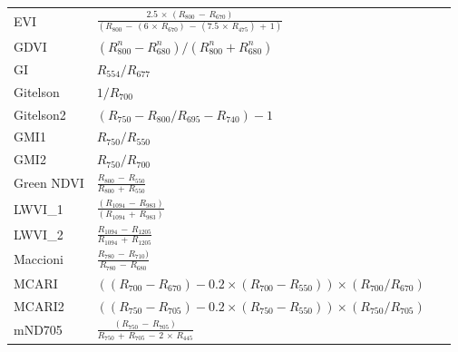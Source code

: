\documentclass[remotesensing,article,accept,moreauthors,pdftex]{Definitions/mdpi}
\begin{document}
\begin{paracol}{2}
\begin{specialtable}[H]
{\begin{tabular}{lll}
		EVI             & $\frac{2.5\,\times\, (R_{800}\,-\,R_{670}) }{ (R_{800}\,-\,(6\,\times\, R_{670})\,-\,(7.5\,\times\, R_{475})\,+\,1)}$           &~\cite{huete1997}             \\
		GDVI            & $(R_{800}^n-R_{680}^n) / (R_{800}^n+R_{680}^n)$  &~\cite{wu2014}                 \\
		GI              & $R_{554}/R_{677}$                                                                                    &~\cite{smith1995}              \\
		Gitelson        & $1/R_{700}$                                                                                          &~\cite{gitelson1999}           \\
		Gitelson2       & $(R_{750}-R_{800}/R_{695}-R_{740})-1$                                                                &~\cite{gitelson2003}           \\
		GMI1            & $R_{750}/R_{550}$                                                                                    &~\cite{gitelson2003}           \\
		GMI2            & $R_{750}/R_{700}$                                                                                    &~\cite{gitelson2003}           \\
		Green NDVI      & $\frac{R_{800}\,-\,R_{550}}{R_{800}\,+\,R_{550}}$                                                            &~\cite{gitelson1996}           \\
		LWVI\_1         & $\frac{(R_{1094}\,-\,R_{983})}{(R_{1094}\,+\,R_{983})}$                                                      &~\cite{galvao2005}             \\
		LWVI\_2         & $\frac{R_{1094}\,-\,R_{1205}}{R_{1094}\,+\,R_{1205}}$                                                        &~\cite{galvao2005}             \\
		Maccioni        & $\frac{R_{780}\,-\,R_{710})}{R_{780}\,-\,R_{680}}$                                                           &~\cite{maccioni2001}           \\
		\midrule
		MCARI           & \parbox{5.5cm}{$((R_{700}-R_{670})-0.2\times (R_{700}-R_{550})) \times (R_{700}/R_{670})$}           &~\cite{daughtry2000}           \\
		\midrule
		MCARI2          & \parbox{5.5cm}{$((R_{750}-R_{705})-0.2 \times (R_{750}-R_{550})) \times (R_{750}/R_{705})$}          &~\cite{wu2008}                \\
		\midrule
		mND705          & $\frac{(R_{750}\,-\,R_{705})}{R_{750}\,+\,R_{705}\,-\,2\,\times\, R_{445}}$                                          &~\cite{sims2002}              \\

\end{tabular}}
\end{specialtable}
\end{paracol}
\end{document}
